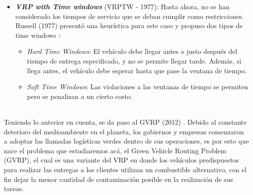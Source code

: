 \documentclass[letter, 10pt]{article}
\begin{document}
\begin{itemize}
    \item \textbf{\emph{VRP with Time windows}} (VRPTW - 1977): Hasta ahora, no se han considerado los tiempos de servicio que se deban cumplir como restricciones. Russell (1977) presentó una heurística para este caso y propuso dos tipos de time windows \cite{doi:10.1287/opre.25.3.517}:
    \begin{itemize}
        \item \emph{Hard Time Windows}: El vehículo debe llegar antes o justo después del tiempo de entrega especificado, y no se permite llegar tarde. Además, si llega antes, el vehículo debe esperar hasta que pase la ventana de tiempo.
        \item \emph{Soft Time Windows}: Las violaciones a las ventanas de tiempo se permiten pero se penalizan a un cierto costo.
    \end{itemize}
\end{itemize}
\\

Teniendo lo anterior en cuenta, se da paso al GVRP (2012) \cite{ERDOGANMILLERHOOKS}. Debido al constante deterioro del medioambiente en el planeta, los gobiernos y empresas comenzaron a adoptar las llamadas logísticas verdes dentro de sus operaciones, es por esto que nace el problema que estudiaremos acá, el Green Vehicle Routing Problem (GVRP), el cual es una variante del VRP en donde los vehículos predispuestos para realizar las entregas a los clientes utilizan un combustible alternativo, con el fin dejar la menor cantidad de contaminación posible en la realización de sus tareas.
\\
\end{document}
